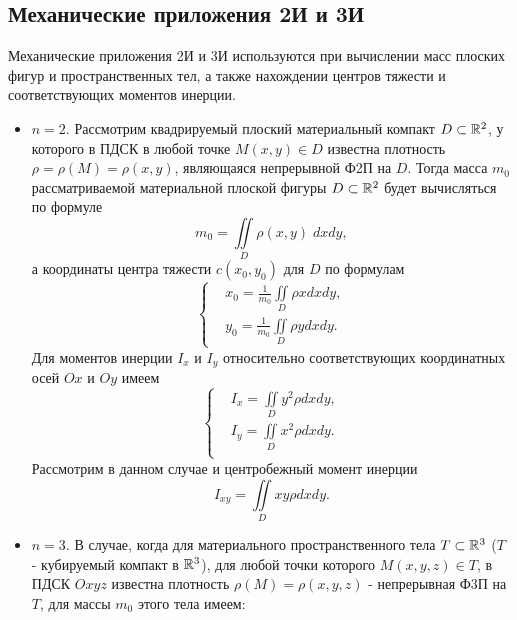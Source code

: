 \subsection{Механические приложения 2И и 3И}
Механические приложения 2И и 3И используются при вычислении масс плоских фигур и пространственных тел, а также нахождении центров
тяжести и соответствующих моментов инерции.
\begin{itemize}
  \item $n = 2$. Рассмотрим квадрируемый плоский материальный компакт
	$D \subset \mathbb{R}^{2}$, у которого в ПДСК в любой точке $M(x, y) \in D$ известна
	плотность $\rho = \rho(M) = \rho(x,y)$, являющаяся непрерывной Ф2П на $D$. Тогда
	масса $m_0$ рассматриваемой материальной плоской фигуры $D \subset \mathbb{R}^{2}$
	будет вычисляться по формуле
	\begin{equation}
		\label{eq:lecture7-15}
		\boxed{m_0 = \iint\limits_D \rho(x, y) \; dxdy,}
	\end{equation}
	а координаты центра тяжести $c(x_0, y_0)$ для $D$ по формулам
	\begin{equation}
		\label{eq:lecture7-16}
		\boxed{\begin{cases}
			&x_0 = \frac{1}{m_0}\iint\limits_D\rho x dx dy,\\
			&y_0 = \frac{1}{m_0}\iint\limits_D\rho y dx dy.
		\end{cases}}
	\end{equation}
	Для моментов инерции $I_x$ и $I_y$ относительно соответствующих координатных
	осей $Ox$ и $Oy$ имеем
	\begin{equation}
		\label{eq:lecture7-17}
		\boxed{\begin{cases}
			&I_x = \iint\limits_Dy^2\rho dx dy,\\
			&I_y = \iint\limits_Dx^2\rho dx dy.\\
		\end{cases}}
	\end{equation}
	Рассмотрим в данном случае и центробежный момент инерции
	\begin{equation}
		\label{eq:lecture7-18}
		\boxed{I_{xy} = \iint\limits_Dxy\rho dx dy.}
	\end{equation}
  \item $n = 3$. В случае, когда для материального пространственного тела
	$T \subset \mathbb{R}^{3}$ ($T$ - кубируемый компакт в $\mathbb{R}^{3}$), для любой точки
	которого $M(x, y, z) \in T$, в ПДСК $Oxyz$ известна плотность $\rho (M) =
	\rho(x, y, z)$ - непрерывная Ф3П на $T$, для массы $m_0$ этого тела имеем:
	\begin{equation}

\end{equation}
\end{itemize}
